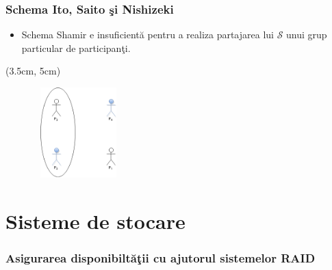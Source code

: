 \documentclass{beamer}
\begin{document}
\begin{frame}
    \frametitle{Schema Ito, Saito \c{s}i Nishizeki}

     {
    \begin{itemize}
        \item Schema Shamir e insuficient\u{a} pentru a realiza partajarea lui $\mathcal{S}$ unui grup particular de participan\c{t}i.
    \end{itemize}
    }
     {
        \begin{textblock*}{4cm}(3.5cm, 5cm)
            \begin{figure}
                \includegraphics[width=3.5cm,height=3.5cm,keepaspectratio]{img/shamir/Ito.png}
           \end{figure}
        \end{textblock*}
    }
\end{frame}

\section{Sisteme de stocare}

\begin{frame}
    \frametitle{Asigurarea disponibilt\u{a}\c{t}ii cu ajutorul sistemelor RAID} 
\end{frame}
\end{document}
